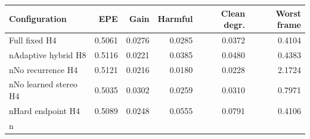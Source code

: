 \begin{tabular}{lrrrrr}
Configuration & EPE & Gain & Harmful & Clean degr. & Worst frame \\ \hline
Full fixed H4 & 0.5061 & 0.0276 & 0.0285 & 0.0372 & 0.4104 \\nAdaptive hybrid H8 & 0.5116 & 0.0221 & 0.0385 & 0.0480 & 0.4383 \\nNo recurrence H4 & 0.5121 & 0.0216 & 0.0180 & 0.0228 & 2.1724 \\nNo learned stereo H4 & 0.5035 & 0.0302 & 0.0259 & 0.0310 & 0.7971 \\nHard endpoint H4 & 0.5089 & 0.0248 & 0.0555 & 0.0791 & 0.4106 \\n\end{tabular}
